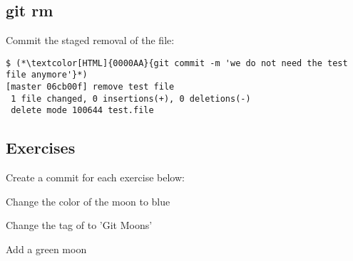 \subsection{git rm}
\begin{frame}[fragile]
\subslidetitle
  Commit the staged removal of the file:
  \begin{lstlisting}
$ (*\textcolor[HTML]{0000AA}{git commit -m 'we do not need the test file anymore'}*)
[master 06cb00f] remove test file
 1 file changed, 0 insertions(+), 0 deletions(-)
 delete mode 100644 test.file
\end{lstlisting}

\end{frame}

\subsection{Exercises}
\begin{frame}[fragile]
\subslidetitle
  Create a commit for each exercise below:
  \begin{exercise}
    \item Change the color of the moon to blue
    \item Change the  tag of  to 'Git Moons'
    \item Add a green moon

  \end{exercise}

\end{frame}

